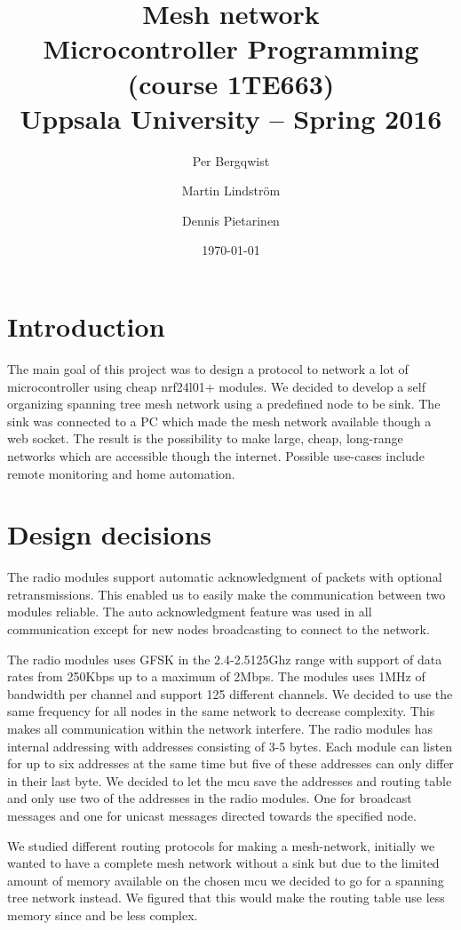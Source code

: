 \documentclass[a4paper,11pt]{article}
\title{\textbf{Mesh network}\\
  Microcontroller Programming (course 1TE663)\\
  Uppsala University -- Spring 2016}
\author{Per Bergqwist \and Martin Lindstr\"om \and Dennis Pietarinen}
\date{\today}
\begin{document}
\maketitle

\tableofcontents

\newpage

\section{Introduction}
The main goal of this project was to design a protocol to network a
lot of microcontroller using cheap nrf24l01+ modules.  We decided to
develop a self organizing spanning tree mesh network using a
predefined node to be sink.  The sink was connected to a PC which made
the mesh network available though a web socket.  The result is the
possibility to make large, cheap, long-range networks which are
accessible though the internet.  Possible use-cases include remote
monitoring and home automation.

\section{Design decisions}
The radio modules support automatic acknowledgment of packets with
optional retransmissions. This enabled us to easily make the
communication between two modules reliable. The auto acknowledgment
feature was used in all communication except for new nodes
broadcasting to connect to the network\cite{nrfDS}.

The radio modules uses GFSK in the 2.4-2.5125Ghz range with support of
data rates from 250Kbps up to a maximum of 2Mbps. The modules uses
1MHz of bandwidth per channel and support 125 different channels. We
decided to use the same frequency for all nodes in the same network to
decrease complexity. This makes all communication within the network
interfere. The radio modules has internal addressing with addresses
consisting of 3-5 bytes. Each module can listen for up to six
addresses at the same time but five of these addresses can only differ
in their last byte. We decided to let the mcu save the addresses and
routing table and only use two of the addresses in the radio
modules. One for broadcast messages and one for unicast messages
directed towards the specified node.

We studied different routing protocols for making a mesh-network,
initially we wanted to have a complete mesh network without a sink but
due to the limited amount of memory available on the chosen mcu we
decided to go for a spanning tree network instead. We figured that
this would make the routing table use less memory since and be less
complex.
\end{document}
